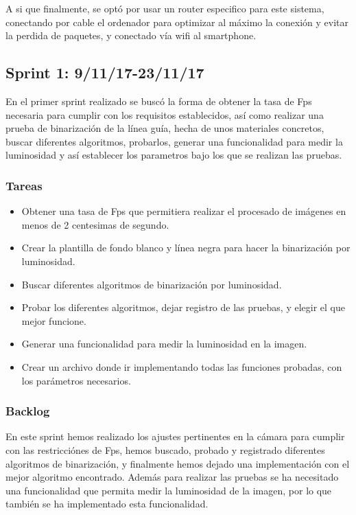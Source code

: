 A si que finalmente, se optó por usar un router especifico para este sistema, conectando por cable el ordenador para optimizar al máximo la conexión y evitar la perdida de paquetes, y conectado vía wifi al smartphone.


\subsection{Sprint 1: 9/11/17-23/11/17}
En el primer sprint realizado se buscó la forma de obtener la tasa de Fps necesaria para cumplir con los requisitos establecidos, así como realizar una prueba de binarización de la línea guía, hecha de unos materiales concretos, buscar diferentes algoritmos, probarlos, generar una funcionalidad para medir la luminosidad y así establecer los parametros bajo los que se realizan las pruebas.

\subsubsection{Tareas}

\begin{itemize}
	\item Obtener una tasa de Fps que permitiera realizar el procesado de imágenes en menos de 2 centesimas de segundo.
	
	\item Crear la plantilla de fondo blanco y línea negra para hacer la binarización por luminosidad.
	
	\item Buscar diferentes algoritmos de binarización por luminosidad.
	
	\item Probar los diferentes algoritmos, dejar registro de las pruebas, y elegir el que mejor funcione.
	
	\item Generar una funcionalidad para medir la luminosidad en la imagen.
	
	\item Crear un archivo donde ir implementando todas las funciones probadas, con los parámetros necesarios.

\end{itemize}

\subsubsection{Backlog}
En este sprint hemos realizado los ajustes pertinentes en la cámara para cumplir con las restricciónes de Fps, hemos buscado, probado y registrado diferentes algoritmos de binarización, y finalmente hemos dejado una implementación con el mejor algoritmo encontrado. Además para realizar las pruebas se ha necesitado una funcionalidad que permita medir la luminosidad de la imagen, por lo que también se ha implementado esta funcionalidad.

